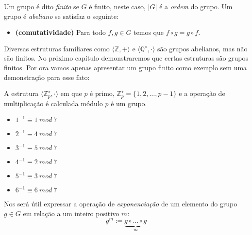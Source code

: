 Um grupo é dito {\em finito} se $G$ é finito, neste caso, $|G|$ é a {\em ordem} do grupo.
Um grupo é {\em abeliano} se satisfaz o seguinte:
\begin{itemize}
\item[] {\bf (comutatividade)} Para todo $f, g \in G$ temos que $f \circ g = g \circ f$.
\end{itemize}

Diversas estruturas familiares como $\langle \mathbb{Z}, + \rangle$ e $\langle \mathbb{Q}^\star, \cdot \rangle$ são grupos abelianos, mas não são finitos.
No próximo capítulo demonstraremos que certas estruturas são grupos finitos.
Por ora vamos apenas apresentar um grupo finito como exemplo sem uma demonstração para esse fato:
\begin{example}
  A estrutura $\langle \mathbb{Z}_p^\star, \cdot \rangle$ em que $p$ é primo, $\mathbb{Z}_p^\star = \{1, 2, \dots, p - 1 \}$ e a operação de multiplicação é calculada módulo $p$ é um grupo.
  \begin{multicols}{2}
    \begin{itemize}
      \item[] $1^{-1} \equiv 1\ mod\ 7$
      \item[] $2^{-1} \equiv 4\ mod\ 7$
      \item[] $3^{-1} \equiv 5\ mod\ 7$
    \end{itemize}
    \begin{itemize}
      \item[] $4^{-1} \equiv 2\ mod\ 7$
      \item[] $5^{-1} \equiv 3\ mod\ 7$
      \item[] $6^{-1} \equiv 6\ mod\ 7$
    \end{itemize}
  \end{multicols}
\end{example}

Nos será útil expressar a operação de {\em exponenciação} de um elemento do grupo $g \in G$ em relação a um inteiro positivo $m$:
\begin{displaymath}
  g^m := \underbrace{g \circ \dots \circ g}_m
\end{displaymath}


